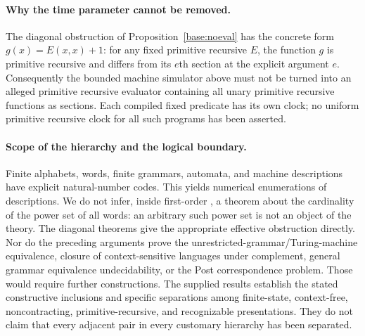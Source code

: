\paragraph{Why the time parameter cannot be removed.}
The diagonal obstruction of Proposition~\ref{base:noeval} has the concrete
form $g(x)=E(x,x)+1$: for any fixed primitive recursive $E$, the function
$g$ is primitive recursive and differs from its $e$th section at the
explicit argument $e$.  Consequently the bounded machine simulator above
must not be turned into an alleged primitive recursive evaluator containing
all unary primitive recursive functions as sections.  Each compiled fixed
predicate has its own clock; no uniform primitive recursive clock for all
such programs has been asserted.

\paragraph{Scope of the hierarchy and the logical boundary.}
Finite alphabets, words, finite grammars, automata, and machine descriptions
have explicit natural-number codes.  This yields numerical enumerations
of descriptions.  We do not infer, inside first-order \ipra, a theorem
about the cardinality of the power set of all words: an arbitrary such
power set is not an object of the theory.  The diagonal theorems give the
appropriate effective obstruction directly.  Nor do the preceding
arguments prove the unrestricted-grammar/Turing-machine equivalence,
closure of context-sensitive languages under complement, general grammar
equivalence undecidability, or the Post correspondence problem.  Those
would require further constructions.  The supplied results establish the stated constructive inclusions and
specific separations among finite-state, context-free, noncontracting,
primitive-recursive, and recognizable presentations.  They do not claim
that every adjacent pair in every customary hierarchy has been separated.
